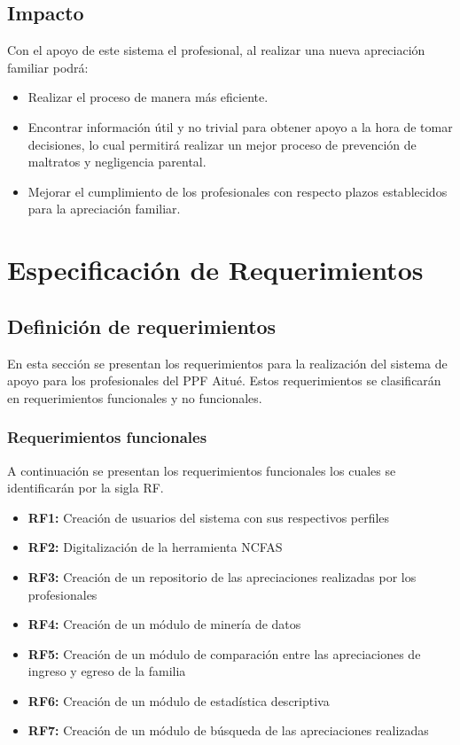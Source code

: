 \subsection{Impacto}
\vspace{1mm}
\normalsize

Con el apoyo de este sistema el profesional, al realizar una nueva apreciación familiar podrá:
\begin{itemize}
	\item Realizar el proceso de manera más eficiente.
	\item Encontrar información útil y no trivial para obtener apoyo a la hora de tomar decisiones, lo cual permitirá realizar un mejor proceso de prevención de maltratos y negligencia parental.
	\item Mejorar el cumplimiento de los profesionales con respecto plazos establecidos para la apreciación familiar. 
\end{itemize}

\section{Especificación de Requerimientos}
\vspace{1mm}
\normalsize

\subsection{Definición de requerimientos}
\vspace{1mm}
\normalsize
En esta sección se presentan los requerimientos para la realización del sistema de apoyo para los profesionales del PPF Aitué. Estos requerimientos se clasificarán en requerimientos funcionales y no funcionales. 

\subsubsection{Requerimientos funcionales}
A continuación se presentan los requerimientos funcionales los cuales se identificarán por la sigla RF.

\begin{itemize}
	\item \textbf{RF1:} Creación de usuarios del sistema con sus respectivos perfiles 
	\item \textbf{RF2:} Digitalización de la herramienta NCFAS
	\item \textbf{RF3:} Creación de un repositorio de las apreciaciones realizadas por los profesionales
	\item \textbf{RF4:} Creación de un módulo de minería de datos
	\item \textbf{RF5:} Creación de un módulo de comparación entre las apreciaciones de ingreso y egreso de la familia
	\item \textbf{RF6:} Creación de un módulo de estadística descriptiva
	\item \textbf{RF7:} Creación de un módulo de búsqueda de las apreciaciones realizadas 
\end{itemize}

